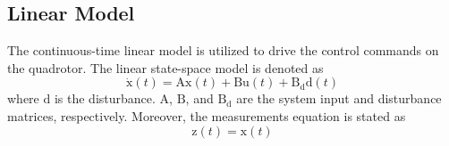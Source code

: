\documentclass[conference]{IEEEtran}
\begin{document}
\subsection{Linear Model}
\noindent The continuous-time linear model is utilized to drive the control commands on the quadrotor. The linear state-space model is denoted as
\begin{equation}\label{eq:linear}
	\boldsymbol{\dot{\mathrm{x}}}(t) = \boldsymbol{\mathrm{Ax}}(t) + \boldsymbol{\mathrm{Bu}}(t) + \boldsymbol{\mathrm{B_{d}d}}(t)
\end{equation}
where $\boldsymbol{\mathrm{d}}$ is the disturbance. $\boldsymbol{\mathrm{A}}$, $\boldsymbol{\mathrm{B}}$, and $\boldsymbol{\mathrm{B_d}}$ are the system input and disturbance matrices, respectively. Moreover, the measurements equation is stated as
\begin{equation}
	\boldsymbol{{\mathrm{z}}}(t) = \boldsymbol{\mathrm{x}}(t)
\end{equation}
\end{document}

